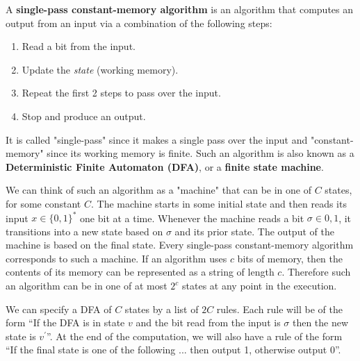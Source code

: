 \documentclass{article}
\begin{document}
  \begin{definition}
  A \textbf{single-pass constant-memory algorithm} is an algorithm that computes an output from an input via a combination of the following steps: 
  \begin{enumerate}
      \item Read a bit from the input. 
      \item Update the \textit{state} (working memory). 
      \item Repeat the first 2 steps to pass over the input. 
      \item Stop and produce an output. 
  \end{enumerate}
  It is called "single-pass" since it makes a single pass over the input and "constant-memory" since its working memory is finite. Such an algorithm is also known as a \textbf{Deterministic Finite Automaton (DFA)}, or a \textbf{finite state machine}. 

  We can think of such an algorithm as a "machine" that can be in one of $C$ states, for some constant $C$. The machine starts in some initial state and then reads its input $x \in \{0, 1\}^*$ one bit at a time. Whenever the machine reads a bit $\sigma \in {0, 1}$, it transitions into a new state based on $\sigma$ and its prior state. The output of the machine is based on the final state. Every single-pass constant-memory algorithm corresponds to such a machine. If an algorithm uses $c$ bits of memory, then the contents of its memory can be represented as a string of length $c$. Therefore such an algorithm can be in one of at most $2^c$ states at any point in the execution.

  We can specify a DFA of $C$ states by a list of $2C$ rules. Each rule will be of the form “If the DFA is in state $v$ and the bit read from the input is $\sigma$ then the new state is $v^\prime$”. At the end of the computation, we will also have a rule of the form “If the final state is one of the following ... then output 1, otherwise output 0”. 
  \end{definition}
\end{document}

